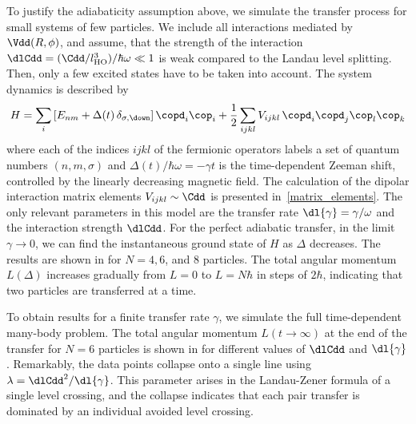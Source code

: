 To justify the adiabaticity assumption above, we simulate the transfer process for small systems of few particles. We include all interactions mediated by $\Vdd(R,\phi)$, and assume, that the strength of the interaction $\dlCdd=(\Cdd/l_\text{HO}^3)/\hbar\omega \ll 1$ is weak compared to the Landau level splitting. Then, only a few excited states have to be taken into account.
The system dynamics is described by
\begin{align}
H=\sum_{i} \left[ E_{nm}  + \Delta(t)\,\delta_{\sigma,\down} \right] \copd_i\cop_i +  \frac{1}{2}\sum_{ijkl} V_{ijkl}\, \copd_i \copd_j \cop_l \cop_k
\end{align}
where each of the indices $ijkl$ of the fermionic operators labels a set of quantum numbers $(n,m,\sigma)$ and $\Delta(t)/\hbar\omega = -\gamma t$ is the time-dependent Zeeman shift, controlled by the linearly decreasing magnetic field. The calculation of the dipolar interaction matrix elements $V_{ijkl}\sim\Cdd$ is presented in~\cref{matrix_elements}. The only relevant parameters in this model are the transfer rate  $\dl{\gamma}=\gamma/\omega$ and the interaction strength $\dlCdd$.
For the perfect adiabatic transfer, in the limit $\gamma\rightarrow 0$, we can find the instantaneous ground state of $H$ as $\Delta$ decreases. The results are shown in  for $N=4,6$, and $8$ particles. The total angular momentum $L(\Delta)$ increases gradually from $L=0$ to $L=N\hbar$ in steps of $2\hbar$, indicating that two particles are transferred at a time.

To obtain results for a finite transfer rate $\gamma$, we simulate the full time-dependent many-body problem.
The total angular momentum $L(t\rightarrow\infty)$ at the end of the transfer for $N=6$ particles is shown in  for different values of $\dlCdd$ and $\dl{\gamma}$.  Remarkably, the data points collapse onto a single line using  $\lambda = \dlCdd^2/\dl{\gamma}$. This parameter arises in the Landau-Zener formula of a single level crossing, and the collapse indicates that
each pair transfer is dominated by an individual avoided level crossing.

